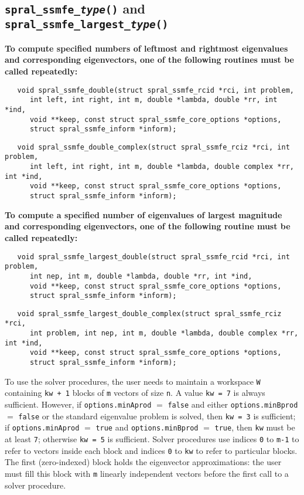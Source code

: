 \subsection{\texttt{spral\_ssmfe\_\textit{type}()} and \texttt{spral\_ssmfe\_largest\_\textit{type}()}} \label{ssmfe_core:fn:ssmfe}

{\bf
To compute specified numbers
of leftmost and rightmost eigenvalues 
and corresponding eigenvectors,
one of the following routines must be called repeatedly:
}

\begin{verbatim}
   void spral_ssmfe_double(struct spral_ssmfe_rcid *rci, int problem,
      int left, int right, int m, double *lambda, double *rr, int *ind,
      void **keep, const struct spral_ssmfe_core_options *options,
      struct spral_ssmfe_inform *inform);
\end{verbatim}
\begin{verbatim}
   void spral_ssmfe_double_complex(struct spral_ssmfe_rciz *rci, int problem,
      int left, int right, int m, double *lambda, double complex *rr, int *ind,
      void **keep, const struct spral_ssmfe_core_options *options,
      struct spral_ssmfe_inform *inform);
\end{verbatim}


\medskip
\noindent
{\bf
To compute a specified number
of eigenvalues of largest magnitude 
and corresponding eigenvectors,
one of the following routine must be called repeatedly:
}

\begin{verbatim}
   void spral_ssmfe_largest_double(struct spral_ssmfe_rcid *rci, int problem,
      int nep, int m, double *lambda, double *rr, int *ind,
      void **keep, const struct spral_ssmfe_core_options *options,
      struct spral_ssmfe_inform *inform);
\end{verbatim}
\begin{verbatim}
   void spral_ssmfe_largest_double_complex(struct spral_ssmfe_rciz *rci,
      int problem, int nep, int m, double *lambda, double complex *rr, int *ind,
      void **keep, const struct spral_ssmfe_core_options *options,
      struct spral_ssmfe_inform *inform);
\end{verbatim}

\medskip
\noindent
To use the solver procedures,
the user needs to maintain a workspace {\tt W} containing
{\tt kw + 1} blocks of {\tt m} vectors of size {\tt n}.
A value {\tt kw = 7} is always sufficient. 
However, if {\tt options.minAprod} $=$ {\tt false}
and either {\tt options.minBprod} $=$ {\tt false} or 
the standard eigenvalue problem  is solved,
then {\tt kw = 3} is sufficient; 
if 
{\tt options.minAprod} $=$ {\tt true} and
{\tt options.minBprod} $=$ {\tt true},
then {\tt kw} must be at least {\tt 7};
otherwise {\tt kw = 5} is sufficient.
Solver procedures
use indices {\tt 0} to {\tt m-1} 
to refer to vectors inside each block
and indices {\tt 0} to {\tt kw} 
to refer to particular blocks.
The first (zero-indexed) block holds the eigenvector approximations:
the user must fill this block with 
{\tt m} linearly independent vectors before the first call
to a solver procedure.

